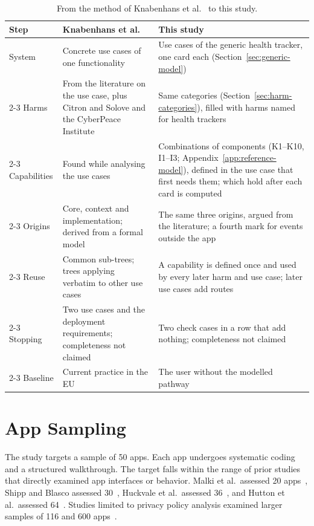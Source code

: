 \begin{table}[H]
\centering
\begin{singlespace}
\caption[From the method of Knabenhans et al.\ to this study]{From the method of
Knabenhans et al.~\parencite[\S\S4.1--4.4]{knabenhans2026harms} to this study.}
\label{tab:tree-steps}
\footnotesize
\begin{tabularx}{\textwidth}{@{}l>{\raggedright\arraybackslash}p{5.2cm}>{\raggedright\arraybackslash}X@{}}
\toprule
\textbf{Step} & \textbf{Knabenhans et al.} & \textbf{This study} \\
\midrule
System & Concrete use cases of one functionality
  & Use cases of the generic health tracker, one card each (Section~\ref{sec:generic-model}) \\
\cmidrule[0.3pt]{2-3}
Harms & From the literature on the use case, plus Citron and Solove and the CyberPeace Institute
  & Same categories (Section~\ref{sec:harm-categories}), filled with harms named for health trackers \\
\cmidrule[0.3pt]{2-3}
Capabilities & Found while analysing the use cases
  & Combinations of components (K1--K10, I1--I3; Appendix~\ref{app:reference-model}), defined in the use case that first needs them; which hold after each card is computed \\
\cmidrule[0.3pt]{2-3}
Origins & Core, context and implementation; derived from a formal model
  & The same three origins, argued from the literature; a fourth mark for events outside the app \\
\cmidrule[0.3pt]{2-3}
Reuse & Common sub-trees; trees applying verbatim to other use cases
  & A capability is defined once and used by every later harm and use case; later use cases add routes \\
\cmidrule[0.3pt]{2-3}
Stopping & Two use cases and the deployment requirements; completeness not claimed
  & Two check cases in a row that add nothing; completeness not claimed \\
\cmidrule[0.3pt]{2-3}
Baseline & Current practice in the EU
  & The user without the modelled pathway \\
\bottomrule
\end{tabularx}
\end{singlespace}
\end{table}

\section{App Sampling}
\label{sec:app-sampling}
The study targets a sample of 50 apps. Each app undergoes systematic coding and a structured
walkthrough. The target falls within the range of prior studies that directly examined app
interfaces or behavior. Malki et al.\ assessed 20 apps~\parencite[p.~4]{malki2024exploring},
Shipp and Blasco assessed 30~\parencite[p.~3]{shipp2020period}, Huckvale et al.\ assessed
36~\parencite{huckvale2019assessment}, and Hutton et al.\ assessed
64~\parencite[p.~5]{hutton2018assessing}. Studies limited to privacy policy analysis examined
larger samples of 116 and 600 apps~\parencite{oloughlin2019reviewing,sunyaev2015availability}.

